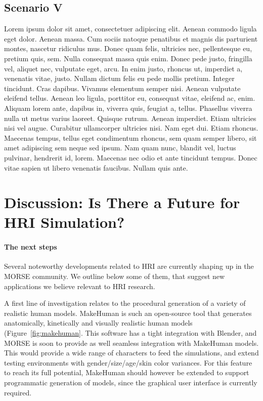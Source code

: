 \documentclass[conference]{IEEEtran}
\begin{document}
\subsection{Scenario V}
\label{scenario5}

Lorem ipsum dolor sit amet, consectetuer adipiscing elit. Aenean commodo ligula
eget dolor. Aenean massa. Cum sociis natoque penatibus et magnis dis parturient
montes, nascetur ridiculus mus. Donec quam felis, ultricies nec, pellentesque
eu, pretium quis, sem. Nulla consequat massa quis enim. Donec pede justo,
fringilla vel, aliquet nec, vulputate eget, arcu. In enim justo, rhoncus ut,
imperdiet a, venenatis vitae, justo. Nullam dictum felis eu pede mollis pretium.
Integer tincidunt. Cras dapibus. Vivamus elementum semper nisi. Aenean vulputate
eleifend tellus. Aenean leo ligula, porttitor eu, consequat vitae, eleifend ac,
enim. Aliquam lorem ante, dapibus in, viverra quis, feugiat a, tellus. Phasellus
viverra nulla ut metus varius laoreet. Quisque rutrum. Aenean imperdiet. Etiam
ultricies nisi vel augue. Curabitur ullamcorper ultricies nisi. Nam eget dui.
Etiam rhoncus. Maecenas tempus, tellus eget condimentum rhoncus, sem quam semper
libero, sit amet adipiscing sem neque sed ipsum. Nam quam nunc, blandit vel,
luctus pulvinar, hendrerit id, lorem. Maecenas nec odio et ante tincidunt
tempus. Donec vitae sapien ut libero venenatis faucibus. Nullam quis ante. 

\section{Discussion: Is There a Future for HRI Simulation?}


\paragraph*{The next steps}

Several noteworthy developments related to HRI are currently shaping up in the
MORSE community. We outline below some of them, that suggest new applications we
believe relevant to HRI research.

A first line of investigation relates to the procedural generation of a variety
of realistic human models. {\sc MakeHuman} is such an open-source tool that
generates anatomically, kinetically and visually realistic human models
(Figure~\ref{fig:makehuman}. This software has a tight integration with Blender,
and MORSE is soon to provide as well seamless integration with {\sc MakeHuman}
models. This would provide a wide range of characters to feed the simulations,
and extend testing environments with gender/size/age/skin color variances.  For
this feature to reach its full potential, {\sc MakeHuman} should however be
extended to support programmatic generation of models, since the graphical user
interface is currently required.
\end{document}
